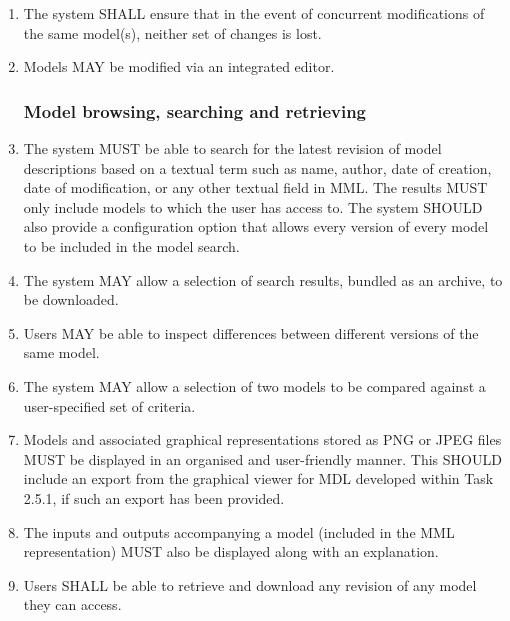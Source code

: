 \begin{enumerate}[1]
\item The system SHALL ensure that in the event of concurrent modifications of the same model(s), neither set of changes is lost.

\item Models MAY be modified via an integrated editor.

\subsubsection{Model browsing, searching and retrieving}
\item The system MUST be able to search for the latest revision of model descriptions based on a textual term such as name, author, date of creation, date of modification, or any other textual field in MML. The results MUST only include models to which the user has access to. The system SHOULD also provide a configuration option that allows every version of every model to be included in the model search.


\item The system MAY allow a selection of search results, bundled as an archive, to be downloaded.

\item Users MAY be able to inspect differences between different versions of the same model.

\item The system MAY allow a selection of two models to be compared against a user-specified set of criteria.

\item Models and associated graphical representations stored as PNG or JPEG files MUST be displayed in an organised and user-friendly manner. This SHOULD include an export from the graphical viewer for MDL developed within Task 2.5.1, if such an export has been provided.

\item The inputs and outputs accompanying a model (included in the MML representation) MUST also be displayed along with an explanation. 

\item Users SHALL be able to retrieve and download any revision of any model they can access.


\end{enumerate}
